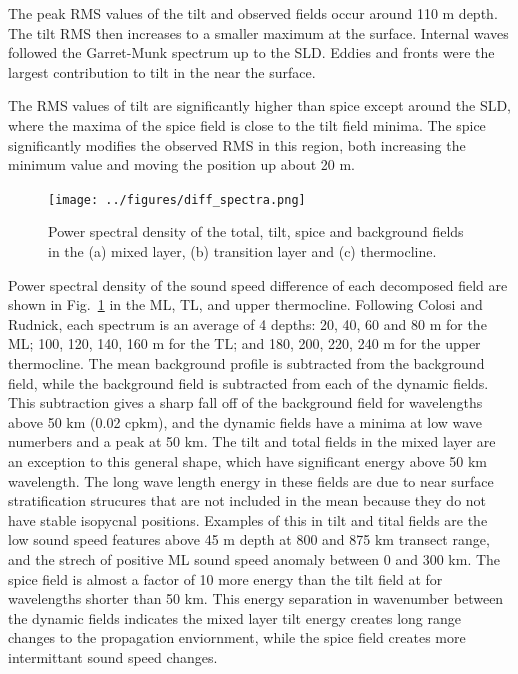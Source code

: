 \documentclass[preprint,NumberedRefs]{JASA}
\begin{document}
The peak RMS values of the tilt and observed fields occur around 110 m depth. The tilt RMS then increases to a smaller maximum at the surface. Internal waves followed the Garret-Munk spectrum up to the SLD. Eddies and fronts were the largest contribution to tilt in the near the surface.

The RMS values of tilt are significantly higher than spice except around the SLD, where the maxima of the spice field is close to the tilt field minima. The spice significantly modifies the observed RMS in this region, both increasing the minimum value and moving the position up about 20 m.

\begin{figure}
\texttt{[image: ../figures/diff\_spectra.png]}
        \caption{\label{fig:spectra}{Power spectral density of the total, tilt, spice and background fields in the (a) mixed layer, (b) transition layer and (c) thermocline.}}
\end{figure}

Power spectral density of the sound speed difference of each decomposed field are shown in Fig.~\ref{fig:spectra} in the ML, TL, and upper thermocline. Following Colosi and Rudnick\cite{colosi2020observations}, each spectrum is an average of 4 depths: 20, 40, 60 and 80 m for the ML; 100, 120, 140, 160 m for the TL; and 180, 200, 220, 240 m for the upper thermocline. The mean background profile is subtracted from the background field, while the background field is subtracted from each of the dynamic fields. This subtraction gives a sharp fall off of the background field for wavelengths above 50 km (0.02 cpkm), and the dynamic fields have a minima at low wave numerbers and a peak at 50 km. The tilt and total fields in the mixed layer are an exception to this general shape, which have significant energy above 50 km wavelength. The long wave length energy in these fields are due to near surface stratification strucures that are not included in the mean because they do not have stable isopycnal positions. Examples of this in tilt and tital fields are the low sound speed features above 45 m depth at 800 and 875 km transect range, and the strech of positive ML sound speed anomaly between 0 and 300 km. The spice field is almost a factor of 10 more energy than the tilt field at for wavelengths shorter than 50 km. This energy separation in wavenumber between the dynamic fields indicates the mixed layer tilt energy creates long range changes to the propagation enviornment, while the spice field creates more intermittant sound speed changes.
\end{document}
